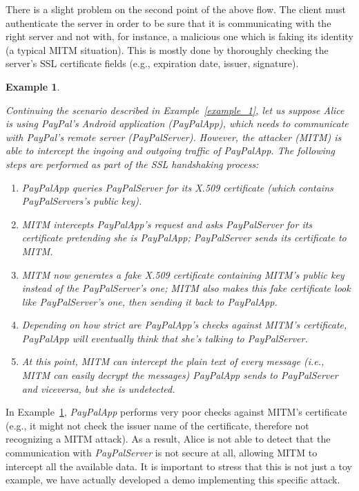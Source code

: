 \documentclass[english]{llncs}
\newtheorem{myexample}{Example}
\begin{document}
There is a slight problem on the second point of the above flow. The client must authenticate the server in order to be sure that it is communicating with the right server and not with, for instance, a malicious one which is faking its identity (a typical MITM situation). This is mostly done by thoroughly checking the server's SSL certificate fields (e.g., expiration date, issuer, signature). 

\begin{myexample}
\label{example_2}


Continuing the scenario described in Example~\ref{example_1}, let us suppose Alice is using PayPal's Android application (PayPalApp), which needs to communicate with PayPal's remote server (PayPalServer). However, the attacker (MITM) is able to intercept the ingoing and outgoing traffic of PayPalApp. The following steps are performed as part of the SSL handshaking process: 
\begin{enumerate}
	\item PayPalApp queries PayPalServer for its X.509 certificate (which contains PayPalServers's public key).
	\item MITM intercepts PayPalApp's request and asks PayPalServer for its certificate pretending she is PayPalApp; PayPalServer sends its certificate to MITM.
	\item MITM now generates a fake X.509 certificate containing MITM's public key instead of the PayPalServer's one; MITM also makes this fake certificate look like PayPalServer's one, then sending it back to PayPalApp.
	\item Depending on how strict are PayPalApp's checks against MITM's certificate, PayPalApp will eventually think that she's talking to PayPalServer.
	\item At this point, MITM can intercept the plain text of every message (i.e., MITM can easily decrypt the messages) PayPalApp sends to PayPalServer and viceversa, but she is undetected.
\end{enumerate}
\end{myexample}

In Example~\ref{example_2}, \emph{PayPalApp} performs very poor checks against MITM's certificate (e.g., it might not check the issuer name of the certificate, therefore not recognizing a MITM attack). As a result, Alice is not able to detect that the communication with \emph{PayPalServer} is not secure at all, allowing MITM to intercept all the available data. It is important to stress that this is not just a toy example, we have actually developed a demo implementing this specific attack.
\end{document}

